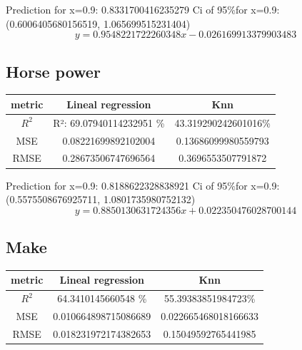 \documentclass{article}
\begin{document}
Prediction for x=0.9: 0.8331700416235279
Ci of  95\%for x=0.9: (0.6006405680156519, 1.065699515231404)
$$y=0.9548221722260348x -0.026169913379903483$$

\subsection{Horse power}
\begin{tabular}{|c|c|c|}
  \hline
   metric & Lineal regression & Knn \\ \hline
   $R^2$& R²: 69.07940114232951 \%&43.319290242601016\%\\
   MSE&  0.08221699892102004& 0.13686099980559793\\
   RMSE&0.28673506747696564&0.3696553507791872\\
   \hline
\end{tabular}

Prediction for x=0.9: 0.8188622328838921
Ci of  95\%for x=0.9: (0.5575508676925711, 1.0801735980752132)
$$y=0.8850130631724356x +0.022350476028700144$$
\subsection{Make}
\begin{tabular}{|c|c|c|}
  \hline
   metric & Lineal regression & Knn \\ \hline
   $R^2$& 64.3410145660548 \%&55.39383851984723\%\\
   MSE&  0.010664898715086689& 0.022665468018166633\\
   RMSE&0.018231972174382653&0.15049592765441985\\
   \hline
\end{tabular}
\end{document}

